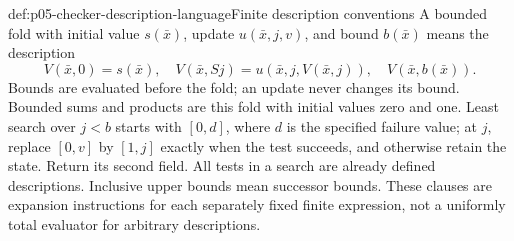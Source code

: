 \begin{hbdefinition}{def:p05-checker-description-language}{Finite description conventions}
A bounded fold with initial value \(s(\bar x)\), update
\(u(\bar x,j,v)\), and bound \(b(\bar x)\) means the description
\[
 V(\bar x,0)=s(\bar x),\quad
 V(\bar x,Sj)=u(\bar x,j,V(\bar x,j)),\quad
 V(\bar x,b(\bar x)).
\]
Bounds are evaluated before the fold; an update never changes its bound.
Bounded sums and products are this fold with initial values zero and one.
Least search over \(j<b\) starts with \([0,d]\), where \(d\) is the
specified failure value; at \(j\), replace \([0,v]\) by \([1,j]\)
exactly when the test succeeds, and otherwise retain the state.  Return its
second field.  All tests in a search are already defined descriptions.
Inclusive upper bounds mean successor bounds.  These clauses are expansion
instructions for each separately fixed finite expression, not a uniformly
total evaluator for arbitrary descriptions.
\end{hbdefinition}

